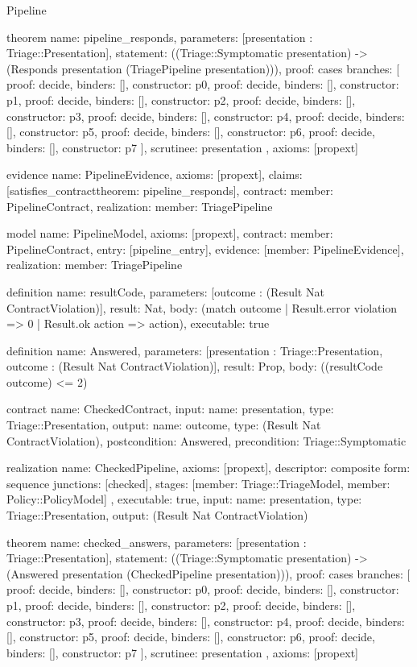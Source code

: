 \begin{lexlean}{Pipeline}
\begin{semanticmodule}
theorem{
  name: pipeline_responds,
  parameters: [presentation : Triage::Presentation],
  statement: ((Triage::Symptomatic presentation) -> (Responds presentation (TriagePipeline presentation))),
  proof: cases{
    branches: [
      {proof: decide{}, binders: [], constructor: p0},
      {proof: decide{}, binders: [], constructor: p1},
      {proof: decide{}, binders: [], constructor: p2},
      {proof: decide{}, binders: [], constructor: p3},
      {proof: decide{}, binders: [], constructor: p4},
      {proof: decide{}, binders: [], constructor: p5},
      {proof: decide{}, binders: [], constructor: p6},
      {proof: decide{}, binders: [], constructor: p7}
    ],
    scrutinee: presentation
  },
  axioms: [propext]
}

evidence{
  name: PipelineEvidence,
  axioms: [propext],
  claims: [satisfies_contract{theorem: pipeline_responds}],
  contract: {member: PipelineContract},
  realization: {member: TriagePipeline}
}

model{
  name: PipelineModel,
  axioms: [propext],
  contract: {member: PipelineContract},
  entry: [pipeline_entry],
  evidence: [{member: PipelineEvidence}],
  realization: {member: TriagePipeline}
}

definition{
  name: resultCode,
  parameters: [outcome : (Result Nat ContractViolation)],
  result: Nat,
  body: (match outcome | Result.error violation => 0 | Result.ok action => action),
  executable: true
}

definition{
  name: Answered,
  parameters: [presentation : Triage::Presentation, outcome : (Result Nat ContractViolation)],
  result: Prop,
  body: ((resultCode outcome) <= 2)
}

contract{
  name: CheckedContract,
  input: {name: presentation, type: Triage::Presentation},
  output: {name: outcome, type: (Result Nat ContractViolation)},
  postcondition: Answered,
  precondition: Triage::Symptomatic
}

realization{
  name: CheckedPipeline,
  axioms: [propext],
  descriptor: composite{
    form: sequence{
      junctions: [checked{}],
      stages: [{member: Triage::TriageModel}, {member: Policy::PolicyModel}]
    }
  },
  executable: true,
  input: {name: presentation, type: Triage::Presentation},
  output: (Result Nat ContractViolation)
}

theorem{
  name: checked_answers,
  parameters: [presentation : Triage::Presentation],
  statement: ((Triage::Symptomatic presentation) -> (Answered presentation (CheckedPipeline presentation))),
  proof: cases{
    branches: [
      {proof: decide{}, binders: [], constructor: p0},
      {proof: decide{}, binders: [], constructor: p1},
      {proof: decide{}, binders: [], constructor: p2},
      {proof: decide{}, binders: [], constructor: p3},
      {proof: decide{}, binders: [], constructor: p4},
      {proof: decide{}, binders: [], constructor: p5},
      {proof: decide{}, binders: [], constructor: p6},
      {proof: decide{}, binders: [], constructor: p7}
    ],
    scrutinee: presentation
  },
  axioms: [propext]
}


\end{semanticmodule}
\end{lexlean}

